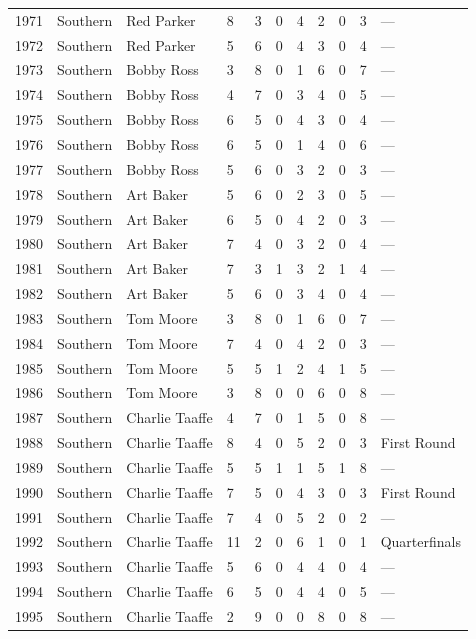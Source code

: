 \documentclass{article}
\begin{document}
\begin{tabular}{lllllllllll}
1971 & Southern & Red Parker & 8 & 3 & 0 & 4 & 2 & 0 & 3 & — \\
1972 & Southern & Red Parker & 5 & 6 & 0 & 4 & 3 & 0 & 4 & — \\
1973 & Southern & Bobby Ross & 3 & 8 & 0 & 1 & 6 & 0 & 7 & — \\
1974 & Southern & Bobby Ross & 4 & 7 & 0 & 3 & 4 & 0 & 5 & — \\
1975 & Southern & Bobby Ross & 6 & 5 & 0 & 4 & 3 & 0 & 4 & — \\
1976 & Southern & Bobby Ross & 6 & 5 & 0 & 1 & 4 & 0 & 6 & — \\
1977 & Southern & Bobby Ross & 5 & 6 & 0 & 3 & 2 & 0 & 3 & — \\
1978 & Southern & Art Baker & 5 & 6 & 0 & 2 & 3 & 0 & 5 & — \\
1979 & Southern & Art Baker & 6 & 5 & 0 & 4 & 2 & 0 & 3 & — \\
1980 & Southern & Art Baker & 7 & 4 & 0 & 3 & 2 & 0 & 4 & — \\
1981 & Southern & Art Baker & 7 & 3 & 1 & 3 & 2 & 1 & 4 & — \\
1982 & Southern & Art Baker & 5 & 6 & 0 & 3 & 4 & 0 & 4 & — \\
1983 & Southern & Tom Moore & 3 & 8 & 0 & 1 & 6 & 0 & 7 & — \\
1984 & Southern & Tom Moore & 7 & 4 & 0 & 4 & 2 & 0 & 3 & — \\
1985 & Southern & Tom Moore & 5 & 5 & 1 & 2 & 4 & 1 & 5 & — \\
1986 & Southern & Tom Moore & 3 & 8 & 0 & 0 & 6 & 0 & 8 & — \\
1987 & Southern & Charlie Taaffe & 4 & 7 & 0 & 1 & 5 & 0 & 8 & — \\
1988 & Southern & Charlie Taaffe & 8 & 4 & 0 & 5 & 2 & 0 & 3 & First Round \\
1989 & Southern & Charlie Taaffe & 5 & 5 & 1 & 1 & 5 & 1 & 8 & — \\
1990 & Southern & Charlie Taaffe & 7 & 5 & 0 & 4 & 3 & 0 & 3 & First Round \\
1991 & Southern & Charlie Taaffe & 7 & 4 & 0 & 5 & 2 & 0 & 2 & — \\
1992 & Southern & Charlie Taaffe & 11 & 2 & 0 & 6 & 1 & 0 & 1 & Quarterfinals \\
1993 & Southern & Charlie Taaffe & 5 & 6 & 0 & 4 & 4 & 0 & 4 & — \\
1994 & Southern & Charlie Taaffe & 6 & 5 & 0 & 4 & 4 & 0 & 5 & — \\
1995 & Southern & Charlie Taaffe & 2 & 9 & 0 & 0 & 8 & 0 & 8 & — \\

\end{tabular}
\end{document}
